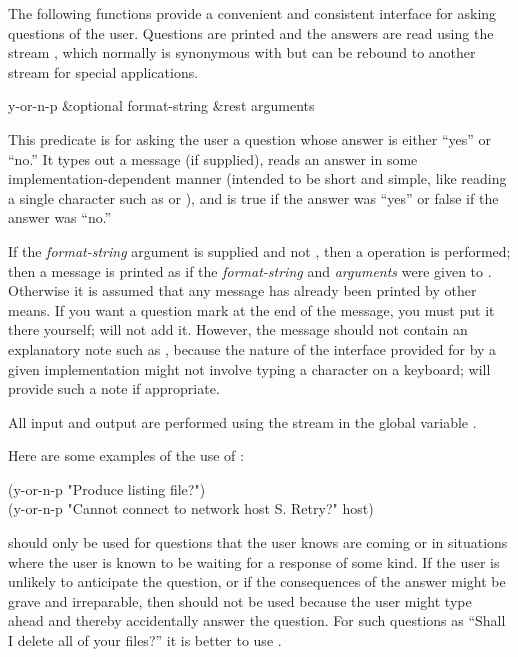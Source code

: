 The following functions provide a convenient and consistent interface for
asking questions of the user.  Questions are printed and the answers are
read using the stream , which normally is synonymous with
 but can be rebound to another stream for special
applications.

\begin{defun}[Function]
y-or-n-p &optional format-string &rest arguments

This predicate is for asking the user a question whose answer is either
``yes'' or ``no.''  It types out a message (if supplied), reads an answer
in some implementation-dependent manner (intended to be short and simple,
like reading a single character such as  or ), and is
true if the answer was ``yes'' or false if the answer was ``no.''

If the \emph{format-string} argument is supplied and not {\false},
then a  operation is performed; then
a message is printed as if the \emph{format-string} and \emph{arguments}
were given to .
Otherwise it is assumed that any message has already been printed
by other means.
If you want a question mark at the end of the message,
you must put it there yourself;  will not add it.
However, the message should not contain an explanatory note such
as , because the nature of the interface provided for
 by a given implementation might not involve typing a
character on a keyboard;  will provide such a note
if appropriate.

All input and output are performed using the stream in the global
variable .

Here are some examples of the use of :
\begin{lisp}
(y-or-n-p "Produce listing file?") \\
(y-or-n-p "Cannot connect to network host {\Xtilde}S.  Retry?" host)
\end{lisp}

 should only be used for questions that the user knows
are coming or in situations where the user is known to be waiting for
a response of some kind.
If the user is unlikely to anticipate the question,
or if the consequences of the answer might be grave and irreparable,
then  should not be used because the user might type ahead
and thereby accidentally answer the question.
For such questions as ``Shall I delete all of your files?'' it is better to use
.
\end{defun}


